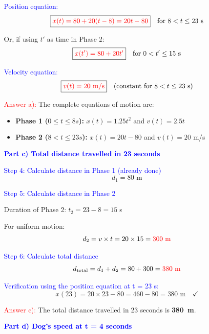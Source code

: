 \begin{exercise}
\begin{solu}
        \textcolor{blue}{Position equation:}
        \[
            \boxed{\textcolor{red}{x(t) = 80 + 20(t - 8) = 20t - 80}} \quad \text{for $8 < t \leq 23$ s}
        \]

        Or, if using $t'$ as time in Phase 2:
        \[
            \boxed{\textcolor{red}{x(t') = 80 + 20t'}} \quad \text{for $0 < t' \leq 15$ s}
        \]

        \textcolor{blue}{Velocity equation:}
        \[
            \boxed{\textcolor{red}{v(t) = 20 \text{ m/s}}} \quad \text{(constant for $8 < t \leq 23$ s)}
        \]

        \textcolor{red}{Answer a):} The complete equations of motion are:
        \begin{itemize}
            \item \textbf{Phase 1 ($0 \leq t \leq 8 s$):} $x(t) = 1.25t^2$ and $v(t) = 2.5t$
            \item \textbf{Phase 2 ($8 < t \leq 23 s$):} $x(t) = 20t - 80$ and $v(t) = 20$ m/s
        \end{itemize}

        \vspace{0.5cm}

        \textbf{\textcolor{blue}{Part c) Total distance travelled in 23 seconds}}

        \textcolor{blue}{Step 4: Calculate distance in Phase 1 (already done)}
        \[
            d_1 = 80 \text{ m}
        \]

        \textcolor{blue}{Step 5: Calculate distance in Phase 2}

        Duration of Phase 2: $t_2 = 23 - 8 = 15$ s

        For uniform motion:
        \[
            d_2 = v \times t = 20 \times 15 = \textcolor{red}{300 \text{ m}}
        \]

        \textcolor{blue}{Step 6: Calculate total distance}
        \[
            d_{\text{total}} = d_1 + d_2 = 80 + 300 = \textcolor{red}{380 \text{ m}}
        \]

        \textcolor{blue}{Verification using the position equation at t = 23 s:}
        \[
            x(23) = 20 \times 23 - 80 = 460 - 80 = 380 \text{ m} \quad \checkmark
        \]

        \textcolor{red}{Answer c):} The total distance travelled in 23 seconds is \textbf{\qty{380}{\m}}.

        \vspace{0.5cm}

        \textbf{\textcolor{blue}{Part d) Dog's speed at t = 4 seconds}}


\end{solu}
\end{exercise}
